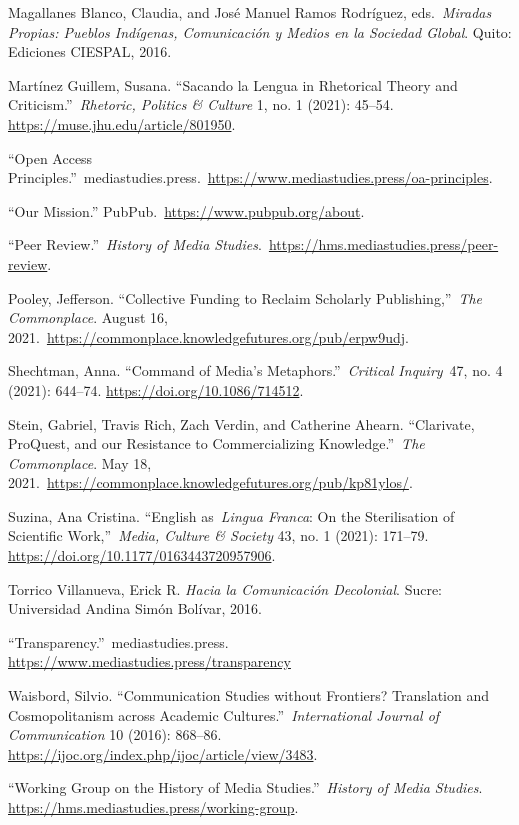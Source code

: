 \documentclass{tufte-handout}
\begin{document}
\begin{hangparas}{.25in}{1}
Magallanes Blanco, Claudia, and José Manuel Ramos Rodríguez,
eds.~\emph{Miradas Propias: Pueblos Indígenas, Comunicación y Medios en
la Sociedad Global}. Quito: Ediciones CIESPAL, 2016.

Martínez Guillem, Susana. ``Sacando la Lengua in Rhetorical Theory and
Criticism.''~\emph{Rhetoric, Politics \& Culture} 1, no. 1 (2021):
45--54. \href{https://muse.jhu.edu/article/801950}{https://muse.jhu.edu/article/801950}.

``Open Access Principles.''~mediastudies.press.~\url{https://www.mediastudies.press/oa-principles}.

``Our Mission.'' PubPub.~\url{https://www.pubpub.org/about}.

``Peer Review.''~\emph{History of Media
Studies}.~\url{https://hms.mediastudies.press/peer-review}.

Pooley, Jefferson. ``Collective Funding to Reclaim Scholarly
Publishing,''~\emph{The Commonplace}. August 16,
2021.~\url{https://commonplace.knowledgefutures.org/pub/erpw9udj}.

Shechtman, Anna. ``Command of Media's Metaphors.''~\emph{Critical
Inquiry}~47, no. 4 (2021): 644--74.
\url{https://doi.org/10.1086/714512}.

Stein, Gabriel, Travis Rich, Zach Verdin, and Catherine Ahearn.
``Clarivate, ProQuest, and our Resistance to Commercializing
Knowledge.''~\emph{The Commonplace}. May 18,
2021.~\url{https://commonplace.knowledgefutures.org/pub/kp81ylos/}.

Suzina, Ana Cristina. ``English as~\emph{Lingua Franca}: On the
Sterilisation of Scientific Work,''~\emph{Media, Culture \& Society} 43,
no. 1 (2021): 171--79. \url{https://doi.org/10.1177/0163443720957906}.

Torrico Villanueva, Erick R. \emph{Hacia la Comunicación Decolonial}. Sucre: Universidad Andina Simón Bolívar, 2016.

``Transparency.''~mediastudies.press.
\url{https://www.mediastudies.press/transparency}

Waisbord, Silvio. ``Communication Studies without Frontiers? Translation
and Cosmopolitanism across Academic Cultures.''~\emph{International
Journal of Communication} 10 (2016): 868--86.
\url{https://ijoc.org/index.php/ijoc/article/view/3483}.

``Working Group on the History of Media Studies.''~\emph{History of
Media Studies}. \url{https://hms.mediastudies.press/working-group}.



\end{hangparas}
\end{document}
